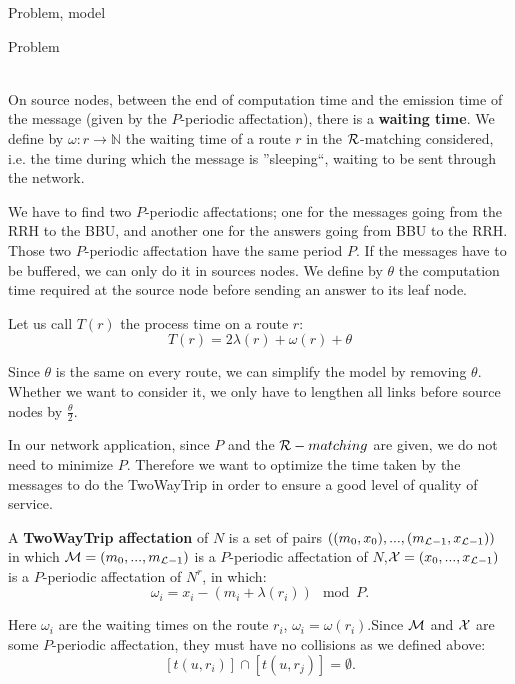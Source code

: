 \documentclass[a4paper,10pt]{report}
\begin{document}
\begin{chapter}{Problem, model}
\begin{section}{Problem}
{{\begin{center}
{
}
\end{center}}}\\

On source nodes, between the end of computation time and the emission time of the message (given by the $P$-periodic affectation), there is a {\bf waiting time}. 
We define by $\omega: r \rightarrow \mathbb{N}$ the waiting time of a route $r$ in the ${\cal R}$-matching considered, i.e. the time during which the
message is ''sleeping``, waiting to be sent through the network.


We have to find two $P$-periodic affectations; one for the messages going from the RRH to the BBU, and another one for the answers going from BBU to the RRH. Those two $P$-periodic affectation have the same period $P$. 
If the messages have to be buffered, we can only do it in sources nodes.
We define by $\theta$ the computation time required at the source node before sending an answer to its leaf node.

Let us call $T (r)$ the process time on a route $r$: $$ T (r) = 2\lambda (r) + \omega (r) + \theta$$

Since $\theta$ is the same on every route, we can simplify the model by removing $\theta$. Whether we want to consider it, we only have to lengthen all 
links before source nodes by $\frac{\theta}{2}$. 


In our network application, since $P$ and the ${\cal R}-matching$ are given, we do not need to minimize $P$.
Therefore we want to optimize the time taken by the messages to do the TwoWayTrip in order to ensure a good level of quality of service.

A {\bf TwoWayTrip affectation} of $N$ is a set of pairs $ ((m_0,x_0),...,(m_{{\cal L}-1},x_{{\cal L}-1}))$ in which ${\cal M} = (m_0,...,m_{{\cal L}-1})$ 
is a $P$-periodic affectation of $N$,${\cal X} = (x_0,...,x_{{\cal L}-1})$ is a $P$-periodic affectation of $N^r$, in which:
$$ \omega_i = x_i - (m_i + \lambda(r_i)) \mod P .$$ 

Here $\omega_i$ are the waiting times on the route $r_i$, $\omega_i = \omega(r_i)$.Since ${\cal M}$ and ${\cal X}$
are some $P$-periodic affectation, they must have no collisions as we defined above:
$$[t(u,r_i)] \cap [t(u,r_j)] = \emptyset .$$


\end{section}
\end{chapter}
\end{document}
